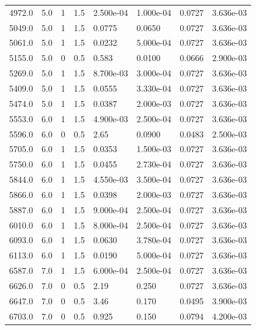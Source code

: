 \documentclass[preview]{standalone}
\begin{document}
{{{\begin{tabular}{L{1.2cm}C{1.2cm} C{0.3cm}C{0.5cm} C{1.4cm}C{1.4cm} C{1.4cm}C{1.4cm}}
  4972.0  &   5.0  & 1     & 1.5 &  2.500e-04  & 1.000e-04  & 0.0727 &  3.636e-03   \\ 
  5049.0  &   5.0  & 1     & 1.5 &  0.0775  & 0.0650  & 0.0727 &  3.636e-03   \\ 
  5061.0  &   5.0  & 1     & 1.5 &  0.0232  & 5.000e-04  & 0.0727 &  3.636e-03   \\ 
  5155.0  &   5.0  & 0     & 0.5 &  0.583  & 0.0100  & 0.0666 &  2.900e-03   \\ 
  5269.0  &   5.0  & 1     & 1.5 &  8.700e-03  & 3.000e-04  & 0.0727 &  3.636e-03   \\ 
  5409.0  &   5.0  & 1     & 1.5 &  0.0555  & 3.330e-04  & 0.0727 &  3.636e-03   \\ 
  5474.0  &   5.0  & 1     & 1.5 &  0.0387  & 2.000e-03  & 0.0727 &  3.636e-03   \\ 
  5553.0  &   6.0  & 1     & 1.5 &  4.900e-03  & 2.500e-04  & 0.0727 &  3.636e-03   \\ 
  5596.0  &   6.0  & 0     & 0.5 &  2.65  & 0.0900  & 0.0483 &  2.500e-03   \\ 
  5705.0  &   6.0  & 1     & 1.5 &  0.0353  & 1.500e-03  & 0.0727 &  3.636e-03   \\ 
  5750.0  &   6.0  & 1     & 1.5 &  0.0455  & 2.730e-04  & 0.0727 &  3.636e-03   \\ 
  5844.0  &   6.0  & 1     & 1.5 &  4.550e-03  & 3.500e-04  & 0.0727 &  3.636e-03   \\ 
  5866.0  &   6.0  & 1     & 1.5 &  0.0398  & 2.000e-03  & 0.0727 &  3.636e-03   \\ 
  5887.0  &   6.0  & 1     & 1.5 &  9.000e-04  & 2.500e-04  & 0.0727 &  3.636e-03   \\ 
  6010.0  &   6.0  & 1     & 1.5 &  8.000e-04  & 2.500e-04  & 0.0727 &  3.636e-03   \\ 
  6093.0  &   6.0  & 1     & 1.5 &  0.0630  & 3.780e-04  & 0.0727 &  3.636e-03   \\ 
  6113.0  &   6.0  & 1     & 1.5 &  0.0190  & 5.000e-04  & 0.0727 &  3.636e-03   \\ 
  6587.0  &   7.0  & 1     & 1.5 &  6.000e-04  & 2.500e-04  & 0.0727 &  3.636e-03   \\ 
  6626.0  &   7.0  & 0     & 0.5 &  2.19  & 0.250  & 0.0727 &  3.636e-03   \\ 
  6647.0  &   7.0  & 0     & 0.5 &  3.46  & 0.170  & 0.0495 &  3.900e-03   \\ 
  6703.0  &   7.0  & 0     & 0.5 &  0.925  & 0.150  & 0.0794 &  4.200e-03   \\ 

\end{tabular}}}}
\end{document}
